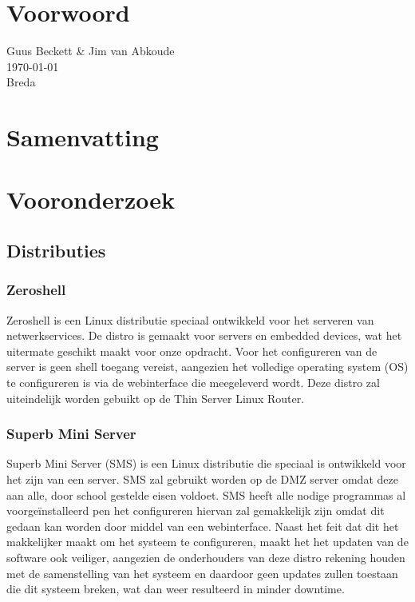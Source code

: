 \documentclass[12pt]{article}
\begin{document}
\clearpage
\section*{Voorwoord}

Guus Beckett \& Jim van Abkoude \\
\today \\
Breda
\newpage
\section*{Samenvatting}
\lipsum[0-2]
\newpage
\tableofcontents
\newpage
{}
\section{Vooronderzoek}
\subsection{Distributies}
\subsubsection{Zeroshell}
Zeroshell is een Linux distributie speciaal ontwikkeld voor het serveren van netwerkservices. De distro is gemaakt voor servers en embedded devices, wat het uitermate geschikt maakt voor onze opdracht. Voor het configureren van de server is geen shell toegang vereist, aangezien het volledige operating system (OS) te configureren is via de webinterface die meegeleverd wordt. Deze distro zal uiteindelijk worden gebuikt op de Thin Server Linux Router.
\subsubsection{Superb Mini Server}
Superb Mini Server (SMS) is een Linux distributie die speciaal is ontwikkeld voor het zijn van een server. SMS zal gebruikt worden op de DMZ server omdat deze aan alle, door school gestelde eisen voldoet. SMS heeft alle nodige programmas al voorge\"installeerd pen het configureren hiervan zal gemakkelijk zijn omdat dit gedaan kan worden door middel van een webinterface. 
Naast het feit dat dit het makkelijker maakt om het systeem te configureren, maakt het het updaten van de software ook veiliger, aangezien de onderhouders van deze distro rekening houden met de samenstelling van het systeem en daardoor geen updates zullen toestaan die dit systeem breken, wat dan weer resulteerd in minder downtime.
\end{document}
